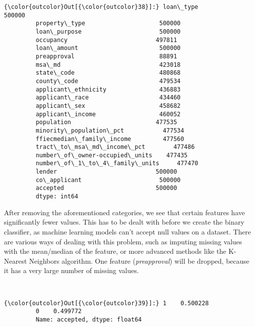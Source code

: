 \documentclass[11pt]{article}
\begin{document}
\begin{Verbatim}[commandchars=\\\{\}]
{\color{outcolor}Out[{\color{outcolor}38}]:} loan\_type                         500000
         property\_type                     500000
         loan\_purpose                      500000
         occupancy                         497811
         loan\_amount                       500000
         preapproval                        88891
         msa\_md                            423018
         state\_code                        480868
         county\_code                       479534
         applicant\_ethnicity               436883
         applicant\_race                    434460
         applicant\_sex                     458682
         applicant\_income                  460052
         population                        477535
         minority\_population\_pct           477534
         ffiecmedian\_family\_income         477560
         tract\_to\_msa\_md\_income\_pct        477486
         number\_of\_owner-occupied\_units    477435
         number\_of\_1\_to\_4\_family\_units     477470
         lender                            500000
         co\_applicant                      500000
         accepted                          500000
         dtype: int64
\end{Verbatim}
            
    After removing the aforementioned categories, we see that certain
features have significantly fewer values. This has to be dealt with
before we create the binary classifier, as machine learning models can't
accept null values on a dataset. There are various ways of dealing with this problem,
such as imputing missing values with the mean/median of the feature,
or more advanced methods like the K-Nearest Neighbors algorithm.
One feature (\emph{preapproval}) will be dropped, because
it has a very large number of missing values.

 \pagebreak

    \begin{center}
    \end{center}
    { \hspace*{\fill} \\}
    
\begin{Verbatim}[commandchars=\\\{\}]
{\color{outcolor}Out[{\color{outcolor}39}]:} 1    0.500228
         0    0.499772
         Name: accepted, dtype: float64
\end{Verbatim}
            
\end{document}

